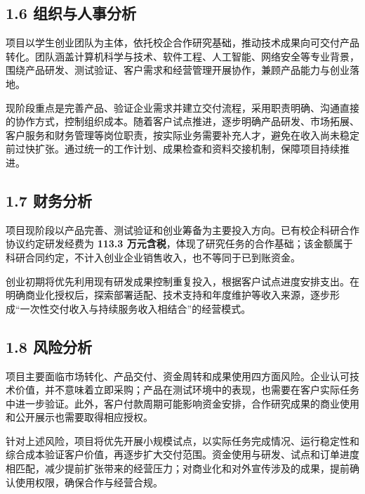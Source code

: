 \subsection{1.6 组织与人事分析}\label{ux7ec4ux7ec7ux4e0eux4ebaux4e8bux5206ux6790}

项目以学生创业团队为主体，依托校企合作研究基础，推动技术成果向可交付产品转化。团队涵盖计算机科学与技术、软件工程、人工智能、网络安全等专业背景，围绕产品研发、测试验证、客户需求和经营管理开展协作，兼顾产品能力与创业落地。

现阶段重点是完善产品、验证企业需求并建立交付流程，采用职责明确、沟通直接的协作方式，控制组织成本。随着客户试点推进，逐步明确产品研发、市场拓展、客户服务和财务管理等岗位职责，按实际业务需要补充人才，避免在收入尚未稳定前过快扩张。通过统一的工作计划、成果检查和资料交接机制，保障项目持续推进。

\subsection{1.7 财务分析}\label{ux8d22ux52a1ux5206ux6790}

项目现阶段以产品完善、测试验证和创业筹备为主要投入方向。已有校企科研合作协议约定研发经费为 \textbf{113.3 万元含税}，体现了研究任务的合作基础；该金额属于科研合同约定，不计入创业企业销售收入，也不等同于已到账资金。

创业初期将优先利用现有研发成果控制重复投入，根据客户试点进度安排支出。在明确商业化授权后，探索部署适配、技术支持和年度维护等收入来源，逐步形成``一次性交付收入与持续服务收入相结合''的经营模式。

\subsection{1.8 风险分析}\label{ux98ceux9669ux5206ux6790}

项目主要面临市场转化、产品交付、资金周转和成果使用四方面风险。企业认可技术价值，并不意味着立即采购；产品在测试环境中的表现，也需要在客户实际任务中进一步验证。此外，客户付款周期可能影响资金安排，合作研究成果的商业使用和公开展示也需要取得相应授权。

针对上述风险，项目将优先开展小规模试点，以实际任务完成情况、运行稳定性和综合成本验证客户价值，再逐步扩大交付范围。资金使用与研发、试点和订单进度相匹配，减少提前扩张带来的经营压力；对商业化和对外宣传涉及的成果，提前确认使用权限，确保合作与经营合规。

